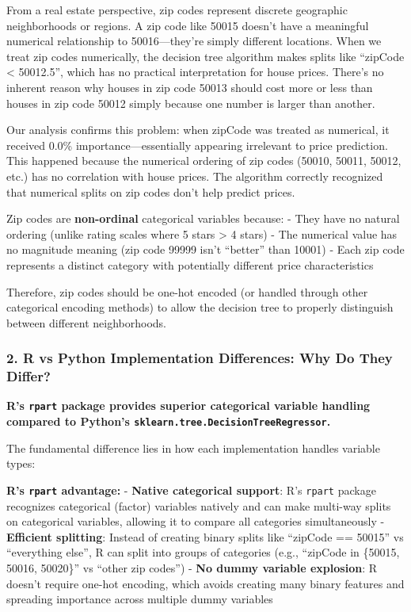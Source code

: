 \documentclass[
  letterpaper,
  DIV=11,
  numbers=noendperiod]{scrartcl}
\begin{document}
From a real estate perspective, zip codes represent discrete geographic
neighborhoods or regions. A zip code like 50015 doesn't have a
meaningful numerical relationship to 50016---they're simply different
locations. When we treat zip codes numerically, the decision tree
algorithm makes splits like ``zipCode \textless{} 50012.5'', which has
no practical interpretation for house prices. There's no inherent reason
why houses in zip code 50013 should cost more or less than houses in zip
code 50012 simply because one number is larger than another.

Our analysis confirms this problem: when zipCode was treated as
numerical, it received 0.0\% importance---essentially appearing
irrelevant to price prediction. This happened because the numerical
ordering of zip codes (50010, 50011, 50012, etc.) has no correlation
with house prices. The algorithm correctly recognized that numerical
splits on zip codes don't help predict prices.

Zip codes are \textbf{non-ordinal} categorical variables because: - They
have no natural ordering (unlike rating scales where 5 stars
\textgreater{} 4 stars) - The numerical value has no magnitude meaning
(zip code 99999 isn't ``better'' than 10001) - Each zip code represents
a distinct category with potentially different price characteristics

Therefore, zip codes should be one-hot encoded (or handled through other
categorical encoding methods) to allow the decision tree to properly
distinguish between different neighborhoods.

\subsubsection{2. R vs Python Implementation Differences: Why Do They
Differ?}\label{r-vs-python-implementation-differences-why-do-they-differ}

\textbf{R's \texttt{rpart} package provides superior categorical
variable handling compared to Python's
\texttt{sklearn.tree.DecisionTreeRegressor}.}

The fundamental difference lies in how each implementation handles
variable types:

\textbf{R's \texttt{rpart} advantage:} - \textbf{Native categorical
support}: R's \texttt{rpart} package recognizes categorical (factor)
variables natively and can make multi-way splits on categorical
variables, allowing it to compare all categories simultaneously -
\textbf{Efficient splitting}: Instead of creating binary splits like
``zipCode == 50015'' vs ``everything else'', R can split into groups of
categories (e.g., ``zipCode in \{50015, 50016, 50020\}'' vs ``other zip
codes'') - \textbf{No dummy variable explosion}: R doesn't require
one-hot encoding, which avoids creating many binary features and
spreading importance across multiple dummy variables
\end{document}
